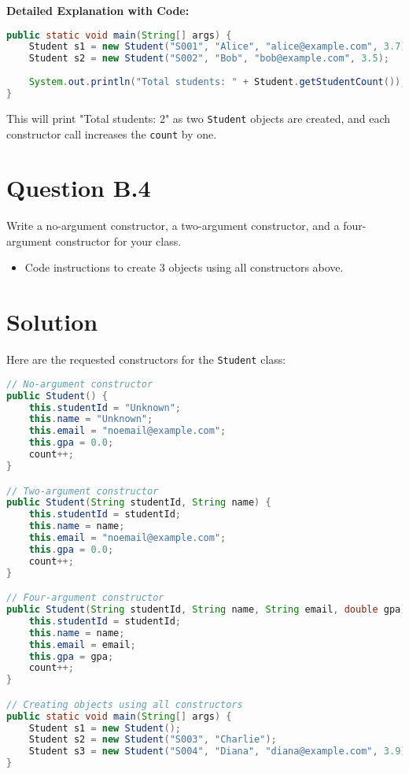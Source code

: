 \documentclass[12pt]{article}
\begin{document}
\textbf{Detailed Explanation with Code:}
\begin{lstlisting}[language=Java]
public static void main(String[] args) {
    Student s1 = new Student("S001", "Alice", "alice@example.com", 3.7);
    Student s2 = new Student("S002", "Bob", "bob@example.com", 3.5);
    
    System.out.println("Total students: " + Student.getStudentCount());
}
\end{lstlisting}

This will print "Total students: 2" as two \texttt{Student} objects are created, and each constructor call increases the \texttt{count} by one.

\newpage

\section*{Question B.4}
Write a no-argument constructor, a two-argument constructor, and a four-argument constructor for your class.
\begin{itemize}
  \item Code instructions to create 3 objects using all constructors above.
\end{itemize}

\section*{Solution}
Here are the requested constructors for the \texttt{Student} class:

\begin{lstlisting}[language=Java]
// No-argument constructor
public Student() {
    this.studentId = "Unknown";
    this.name = "Unknown";
    this.email = "noemail@example.com";
    this.gpa = 0.0;
    count++;
}

// Two-argument constructor
public Student(String studentId, String name) {
    this.studentId = studentId;
    this.name = name;
    this.email = "noemail@example.com";
    this.gpa = 0.0;
    count++;
}

// Four-argument constructor
public Student(String studentId, String name, String email, double gpa) {
    this.studentId = studentId;
    this.name = name;
    this.email = email;
    this.gpa = gpa;
    count++;
}

// Creating objects using all constructors
public static void main(String[] args) {
    Student s1 = new Student();
    Student s2 = new Student("S003", "Charlie");
    Student s3 = new Student("S004", "Diana", "diana@example.com", 3.9);
}
\end{lstlisting}
\end{document}

